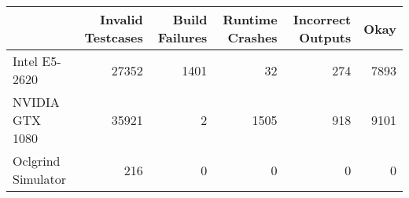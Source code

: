 \begin{tabular}{lrrrrr}
\toprule
{} &  Invalid Testcases &  Build Failures &  Runtime Crashes &  Incorrect Outputs &  Okay \\
\midrule
Intel E5-2620      &              27352 &            1401 &               32 &                274 &  7893 \\
NVIDIA GTX 1080    &              35921 &               2 &             1505 &                918 &  9101 \\
Oclgrind Simulator &                216 &               0 &                0 &                  0 &     0 \\
\bottomrule
\end{tabular}
